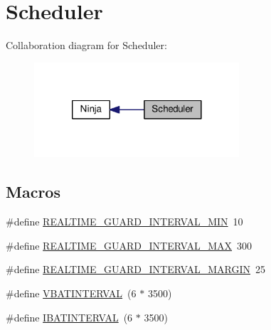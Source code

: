 \hypertarget{group__scheduler}{\section{Scheduler}
\label{group__scheduler}
}
Collaboration diagram for Scheduler\+:\nopagebreak
\begin{figure}[H]
\begin{center}
\leavevmode
\includegraphics[width=216pt]{group__scheduler}
\end{center}
\end{figure}
\subsection*{Macros}
\begin{DoxyCompactItemize}
\item 
\#define \hyperlink{group__scheduler_gac2ea754fe84fe2767fafa37c3bbc0a1b}{R\+E\+A\+L\+T\+I\+M\+E\+\_\+\+G\+U\+A\+R\+D\+\_\+\+I\+N\+T\+E\+R\+V\+A\+L\+\_\+\+M\+I\+N}~10
\item 
\#define \hyperlink{group__scheduler_gad5f4b8b801ca0114e2f2cff7c5b28038}{R\+E\+A\+L\+T\+I\+M\+E\+\_\+\+G\+U\+A\+R\+D\+\_\+\+I\+N\+T\+E\+R\+V\+A\+L\+\_\+\+M\+A\+X}~300
\item 
\#define \hyperlink{group__scheduler_gaf1515d6de09f018d8f29714b03a80704}{R\+E\+A\+L\+T\+I\+M\+E\+\_\+\+G\+U\+A\+R\+D\+\_\+\+I\+N\+T\+E\+R\+V\+A\+L\+\_\+\+M\+A\+R\+G\+I\+N}~25
\item 
\#define \hyperlink{group__scheduler_ga2d970434746655e627472632325aef4a}{V\+B\+A\+T\+I\+N\+T\+E\+R\+V\+A\+L}~(6 $\ast$ 3500)
\item 
\#define \hyperlink{group__scheduler_gabd955c9494c8c249d7861527da1220bc}{I\+B\+A\+T\+I\+N\+T\+E\+R\+V\+A\+L}~(6 $\ast$ 3500)
\end{DoxyCompactItemize}
